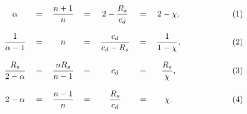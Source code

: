 \begingroup
\sloppy
\begin{subequations}
    \makebox[0.98\textwidth][l]{
        \begin{tabular}{cccccccccr}
    ~\hspace{35px}~&&&&&&&&~\hspace{35px}~&\\ &
          $\dst \alpha 
    $&$=$&$\dst \frac{n+1}{n}
    $&$=$&$\dst 2-\frac{R_s}{c_d} 
    $&$=$&$\dst 2-\chi 
    ,$&&\refstepcounter{equation}(\theequation)\\~\\ &
          $\dst \frac{1}{\alpha-1}
    $&$=$&$\dst n
    $&$=$&$\dst \frac{c_d}{c_d-R_s}
    $&$=$&$\dst \frac{1}{1-\chi}
    ,$&&\refstepcounter{equation}(\theequation)\\~\\ &
          $\dst \frac{R_s}{2-\alpha}
    $&$=$&$\dst \frac{n R_s}{n-1}
    $&$=$&$\dst c_d
    $&$=$&$\dst \frac{R_s}{\chi}
    ,$&&\refstepcounter{equation}(\theequation)\\~\\ &
          $\dst 2-\alpha
    $&$=$&$\dst \frac{n-1}{n}
    $&$=$&$\dst \frac{R_s}{c_d}
    $&$=$&$\dst \chi
    .$&&\refstepcounter{equation}(\theequation)\\~\\ &
    ~
\end{tabular}
}
\end{subequations}
\endgroup

